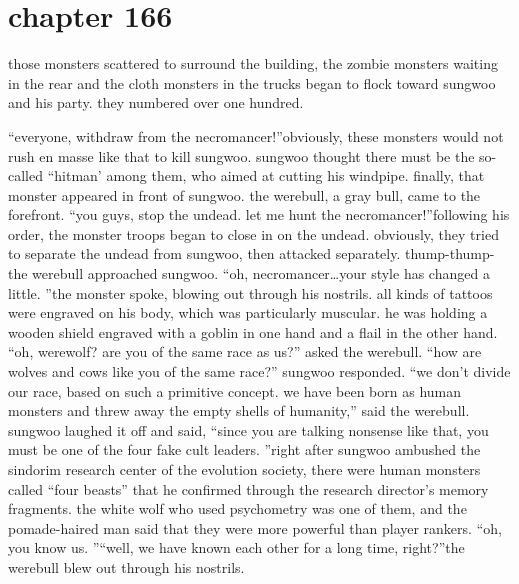 \section{chapter 166}

                            those monsters scattered to surround the building, the zombie monsters waiting in the rear and the cloth monsters in the trucks began to flock toward sungwoo and his party.
 they numbered over one hundred.





“everyone, withdraw from the necromancer!”obviously, these monsters would not rush en masse like that to kill sungwoo.
 sungwoo thought there must be the so-called “hitman’ among them, who aimed at cutting his windpipe.
finally, that monster appeared in front of sungwoo.
the werebull, a gray bull, came to the forefront.
“you guys, stop the undead.
 let me hunt the necromancer!”following his order, the monster troops began to close in on the undead.
 obviously, they tried to separate the undead from sungwoo, then attacked separately.
thump-thump-the werebull approached sungwoo.
“oh, necromancer…your style has changed a little.
”the monster spoke, blowing out through his nostrils.
 all kinds of tattoos were engraved on his body, which was particularly muscular.
 he was holding a wooden shield engraved with a goblin in one hand and a flail in the other hand.
“oh, werewolf? are you of the same race as us?” asked the werebull.
“how are wolves and cows like you of the same race?” sungwoo responded.
“we don’t divide our race, based on such a primitive concept.
 we have been born as human monsters and threw away the empty shells of humanity,” said the werebull.
sungwoo laughed it off and said, “since you are talking nonsense like that, you must be one of the four fake cult leaders.
”right after sungwoo ambushed the sindorim research center of the evolution society, there were human monsters called “four beasts” that he confirmed through the research director’s memory fragments.
the white wolf who used psychometry was one of them, and the pomade-haired man said that they were more powerful than player rankers.
“oh, you know us.
”“well, we have known each other for a long time, right?”the werebull blew out through his nostrils.

